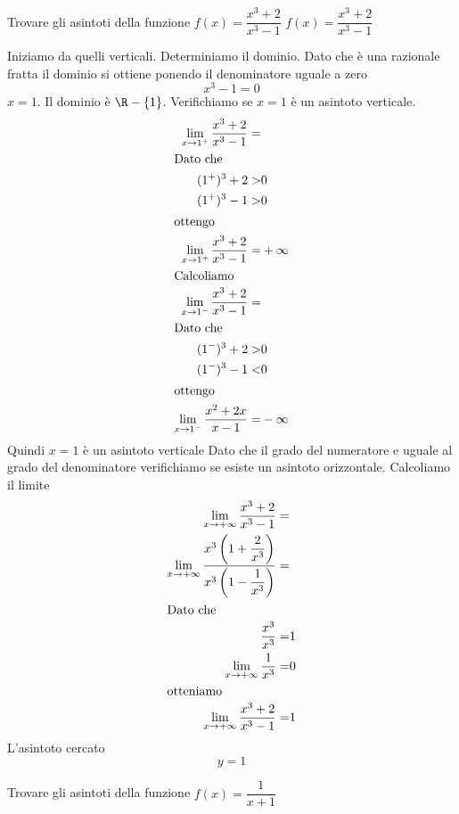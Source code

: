 \begin{exercise}
	Trovare gli asintoti della funzione $f(x)=\dfrac{x^3+2}{x^3-1}$
	\tcblower
$f(x)=\dfrac{x^3+2}{x^3-1}$	
	
	Iniziamo da quelli verticali. Determiniamo il dominio. Dato che è una razionale fratta il dominio si ottiene ponendo il denominatore uguale a zero\[x^3-1=0\] $x=1$. Il dominio è $\R-\lbrace1\rbrace$. Verifichiamo se $x=1$ è un asintoto verticale.
	\begin{align*}
	\lim_{x\to 1^+}\dfrac{x^3+2}{x^3-1}=&\\
	\intertext{Dato che}
	(1^+)^3+2>&0\\
	(1^+)^3-1>&0\\
	\intertext{ottengo}
	\lim_{x\to 1^+}\dfrac{x^3+2}{x^3-1}=&+\infty\\
		\intertext{Calcoliamo}
	\lim_{x\to 1^-}\dfrac{x^3+2}{x^3-1}=&\\
		\intertext{Dato che}
	(1^-)^3+2>&0\\
	(1^-)^3-1<&0\\
	\intertext{ottengo}
	\lim_{x\to 1^-}\dfrac{x^2+2x}{x-1}=&-\infty\\
	\end{align*}
	Quindi $x=1$ è un asintoto verticale
	Dato che il grado del numeratore e uguale al grado del denominatore verifichiamo se esiste un asintoto orizzontale. Calcoliamo il limite
	\begin{align*}
	\lim_{x\to +\infty}\dfrac{x^3+2}{x^3-1}=&\\
	\lim_{x\to +\infty}\dfrac{x^3\left(1+\dfrac{2}{x^3}\right)}{x^3\left(1-\dfrac{1}{x^3}\right)}=&\\
	\intertext{Dato che}
	\dfrac{x^3}{x^3}=&1\\
	\lim_{x\to +\infty}\dfrac{1}{x^3}=&0\\
	\intertext{otteniamo}
	\lim_{x\to +\infty}\dfrac{x^3+2}{x^3-1}=&1\\
	\end{align*}
	L'asintoto cercato\[y=1\]
\end{exercise}
\begin{exercise}[no solution]
	Trovare gli asintoti della funzione
	$f(x)=\dfrac{1}{x+1}$
\end{exercise}
